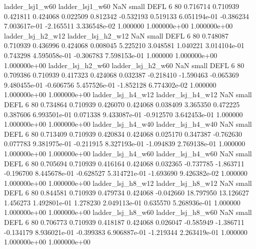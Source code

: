          ladder_lsj1_w60          ladder_lsj1_w60                   NaN      small     DEFL                 6 80 0.716714       0.710939 0.421811       0.424068    0.022509      0.812342     -0.532193     0.519133   6.051194e-01 -0.386234 7.003617e-01    -2.165511   3.336548e-02            1.000000    1.000000e+00        1.000000e+00
       ladder_lsj_h2_w12        ladder_lsj_h2_w12                   NaN      small     DEFL                 6 80 0.748087       0.710939 0.436996       0.424068    0.008045      5.225210      3.048581     1.040221   3.014104e-01  0.743298 4.595058e-01    -0.306783   7.598153e-01            1.000000    1.000000e+00        1.000000e+00
       ladder_lsj_h2_w60        ladder_lsj_h2_w60                   NaN      small     DEFL                 6 80 0.709386       0.710939 0.417323       0.424068    0.032387     -0.218410     -1.590463    -0.065369   9.480455e-01 -0.606756 5.457526e-01    -1.852128   6.774302e-02            1.000000    1.000000e+00        1.000000e+00
       ladder_lsj_h4_w12        ladder_lsj_h4_w12                   NaN      small     DEFL                 6 80 0.734864       0.710939 0.426070       0.424068    0.038409      3.365350      0.472225     0.387606   6.993501e-01  0.071338 9.433087e-01    -0.912570   3.642453e-01            1.000000    1.000000e+00        1.000000e+00
       ladder_lsj_h4_w40        ladder_lsj_h4_w40                   NaN      small     DEFL                 6 80 0.713409       0.710939 0.420834       0.424068    0.025170      0.347387     -0.762630     0.077783   9.381975e-01 -0.211915 8.327193e-01    -1.094839   2.769138e-01            1.000000    1.000000e+00        1.000000e+00
       ladder_lsj_h4_w60        ladder_lsj_h4_w60                   NaN      small     DEFL                 6 80 0.705694       0.710939 0.416164       0.424068    0.032365     -0.737785     -1.863711    -0.196700   8.445678e-01 -0.628527 5.314721e-01    -1.693690   9.426382e-02            1.000000    1.000000e+00        1.000000e+00
       ladder_lsj_h8_w12        ladder_lsj_h8_w12                   NaN      small     DEFL                 6 80 0.844581       0.710939 0.479734       0.424068   -0.042660     18.797950     13.126627     1.456273   1.492801e-01  1.278230 2.049113e-01     0.635570   5.268936e-01            1.000000    1.000000e+00        1.000000e+00
       ladder_lsj_h8_w60        ladder_lsj_h8_w60                   NaN      small     DEFL                 6 80 0.706773       0.710939 0.418187       0.424068    0.026047     -0.585949     -1.386711    -0.134179   8.936021e-01 -0.399383 6.906887e-01    -1.219344   2.263419e-01            1.000000    1.000000e+00        1.000000e+00
